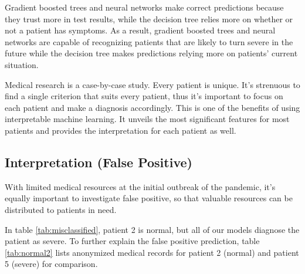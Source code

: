 Gradient boosted trees and neural networks make correct predictions because they trust more in test results, while the decision tree relies more on whether or not a patient has symptoms. As a result, gradient boosted trees and neural networks are capable of recognizing patients that are likely to turn severe in the future while the decision tree makes predictions relying more on patients' current situation.

Medical research is a case-by-case study. Every patient is unique. It's strenuous to find a single criterion that suits every patient, thus it's important to focus on each patient and make a diagnosis accordingly. This is one of the benefits of using interpretable machine learning. It unveils the most significant features for most patients and provides the interpretation for each patient as well.
\color{black}

\subsection{\textbf{Interpretation (False Positive)}}

With limited medical resources at the initial outbreak of the pandemic, it's equally important to investigate false positive, so that valuable resources can be distributed to patients in need.

In table \ref{tab:misclassified}, patient 2 is normal, but all of our models diagnose the patient as severe. To further explain the false positive prediction, table \ref{tab:normal2} lists anonymized medical records for patient 2 (normal) and patient 5 (severe) for comparison.

